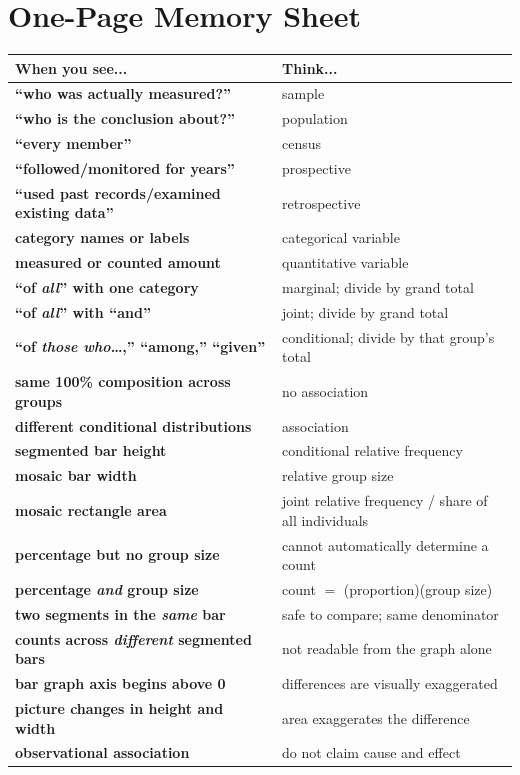 \documentclass[11pt]{article}
\renewcommand{\arraystretch}{1.22}
\begin{document}
\newpage
\section{One-Page Memory Sheet}

\noindent
\begin{minipage}[t]{0.58\textwidth}
\vspace{0pt}
\scriptsize
\renewcommand{\arraystretch}{1.03}
\begin{tabularx}{\linewidth}{>{\bfseries\color{Navy}}p{1.33in} Y}
\toprule
When you see... & Think...\\
\midrule
``who was actually measured?'' & sample\\
``who is the conclusion about?'' & population\\
``every member'' & census\\
``followed/monitored for years'' & prospective\\
``used past records/examined existing data'' & retrospective\\
category names or labels & categorical variable\\
measured or counted amount & quantitative variable\\
``of \emph{all}'' with one category & marginal; divide by grand total\\
``of \emph{all}'' with ``and'' & joint; divide by grand total\\
``of \emph{those who}\dots,'' ``among,'' ``given'' & conditional; divide by that group's total\\
same 100\% composition across groups & no association\\
different conditional distributions & association\\
segmented bar height & conditional relative frequency\\
mosaic bar width & relative group size\\
mosaic rectangle area & joint relative frequency / share of all individuals\\
percentage but no group size & cannot automatically determine a count\\
percentage \emph{and} group size & count $=$ (proportion)(group size)\\
two segments in the \emph{same} bar & safe to compare; same denominator\\
counts across \emph{different} segmented bars & not readable from the graph alone\\
bar graph axis begins above 0 & differences are visually exaggerated\\
picture changes in height and width & area exaggerates the difference\\
observational association & do not claim cause and effect\\
\bottomrule
\end{tabularx}
\end{minipage}\hfill
\end{document}
